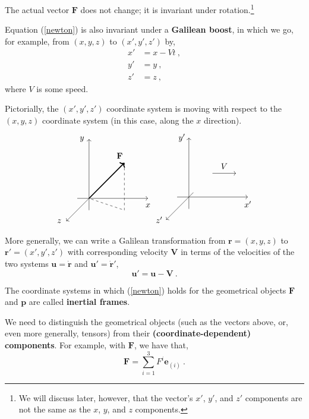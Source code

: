 \documentclass[11pt]{article}
\begin{document}
The actual vector $\textbf{F}$ does not change; it is invariant under rotation.\footnote{We will discuss later, however, that the vector's $x'$, $y'$, and $z'$ components are not the same as the $x$, $y$, and $z$ components.}

Equation (\ref{newton}) is also invariant under a \textbf{Galilean boost}, in which we go, for example, from $(x,y,z)$ to $(x',y',z')$ by,
\begin{align}
x' &= x-Vt\ ,\\
y' &= y\ ,\\
z' &= z\ ,
\end{align}
where $V$ is some speed.\pagebreak

Pictorially, the $(x',y',z')$ coordinate system is moving with respect to the $(x,y,z)$ coordinate system (in this case, along the $x$ direction).
\[
\begin{tikzpicture}
\draw[->] (-0.5,0,0) to (2.5,0,0);
\draw[->] (0,-0.5,0) to (0,2.5,0);
\draw[->] (0,0,-0.5) to (0,0,2.5);

\node at (2.5,-0.3) {$x$};
\node at (-0.3,2.5) {$y$};
\node at (-0.3,0,2.5) {$z$};
\draw[->,very thick] (0,0,0) to (1.5,1.5,0);
\node at (1.3,1.8,0) {$\textbf{F}$};

\draw[-,dashed] (1.5,1.5) to (1.5,-0.5) to (0,0);
\end{tikzpicture}
\begin{tikzpicture}
\draw[->] (-0.5,0,0) to (2.5,0,0);
\draw[->] (0,-0.5,0) to (0,2.5,0);
\draw[->] (0,0,-0.5) to (0,0,2.5);

\node at (2.5,-0.3) {$x'$};
\node at (-0.3,2.5) {$y'$};
\node at (-0.3,0,2.5) {$z'$};

\draw[->] (1,1) to (2,1);
\node at (1.5,1.3) {$V$};
\end{tikzpicture}
\]

More generally, we can write a Galilean transformation from $\textbf{r} = (x,y,z)$ to $\textbf{r}' = (x',y',z')$ with corresponding velocity $\textbf{V}$ in terms of the velocities of the two systems $\textbf{u} = \dot{\textbf{r}}$ and $\textbf{u}' = \dot{\textbf{r}}'$,
\begin{equation}
\textbf{u}' = \textbf{u} - \textbf{V}\ .
\end{equation}

The coordinate systems in which (\ref{newton}) holds for the geometrical objects $\textbf{F}$ and $\textbf{p}$ are called \textbf{inertial frames}.

We need to distinguish the geometrical objects (such as the vectors above, or, even more generally, tensors) from their \textbf{(coordinate-dependent) components}. For example, with $\textbf{F}$, we have that,
\begin{equation}
\textbf{F} = \sum_{i=1}^3 F^i \textbf{e}_{(i)}\ .
\end{equation}
\end{document}
